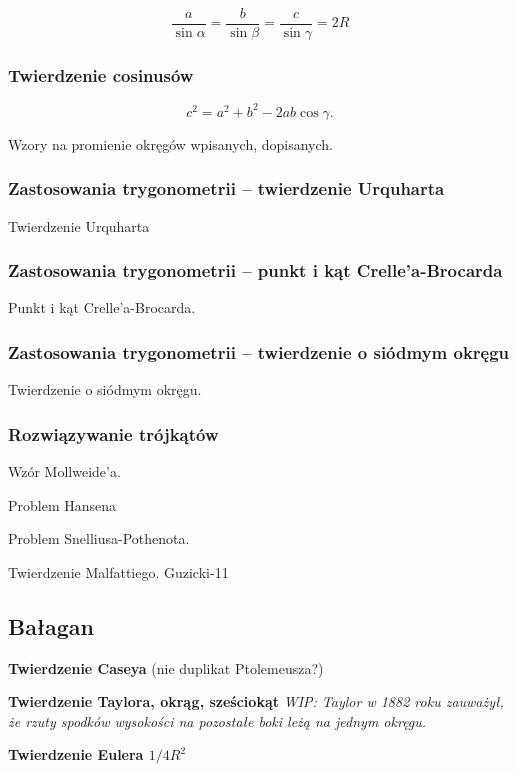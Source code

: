 $$\frac{a}{\sin \alpha} = \frac{b}{\sin \beta} = \frac{c}{\sin \gamma} = 2R$$

\subsubsection{Twierdzenie cosinusów}
\begin{proposition}
	\label{twierdzenie_cosinusow}%
	\begin{equation}
		c^2 = a^2 + b^2 - 2ab \cos \gamma.
	\end{equation}
\end{proposition}

%

Wzory na promienie okręgów wpisanych, dopisanych.


\subsubsection{Zastosowania trygonometrii -- twierdzenie Urquharta}
Twierdzenie Urquharta

\subsubsection{Zastosowania trygonometrii -- punkt i kąt Crelle'a-Brocarda}
Punkt i kąt Crelle'a-Brocarda.

\subsubsection{Zastosowania trygonometrii -- twierdzenie o siódmym okręgu}
Twierdzenie o siódmym okręgu.

\subsubsection{Rozwiązywanie trójkątów}
Wzór Mollweide'a.
%

Problem Hansena
%

Problem Snelliusa-Pothenota.
%



Twierdzenie Malfattiego.
Guzicki-11

\subsection{Bałagan}

\textbf{Twierdzenie Caseya} (nie duplikat Ptolemeusza?)

\textbf{Twierdzenie Taylora, okrąg, sześciokąt}
{
    \emph{WIP: Taylor w 1882 roku zauważył, że rzuty spodków wysokości na pozostałe boki leżą na jednym okręgu.}
}

\textbf{Twierdzenie Eulera $1/4R^2$}



%